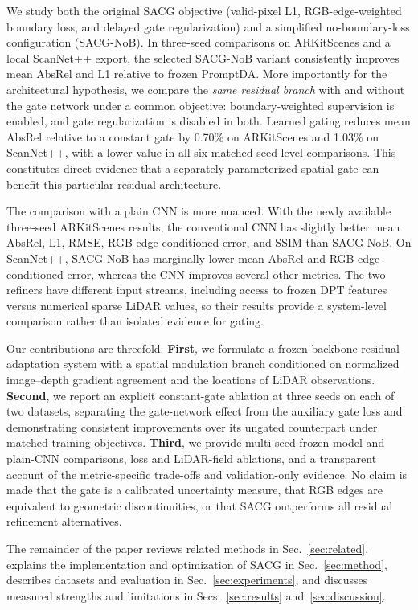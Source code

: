 We study both the original SACG objective (valid-pixel L1, RGB-edge-weighted boundary loss, and delayed gate regularization) and a simplified no-boundary-loss configuration (SACG-NoB). In three-seed comparisons on ARKitScenes and a local ScanNet++ export, the selected SACG-NoB variant consistently improves mean AbsRel and L1 relative to frozen PromptDA. More importantly for the architectural hypothesis, we compare the \emph{same residual branch} with and without the gate network under a common objective: boundary-weighted supervision is enabled, and gate regularization is disabled in both. Learned gating reduces mean AbsRel relative to a constant gate by 0.70\% on ARKitScenes and 1.03\% on ScanNet++, with a lower value in all six matched seed-level comparisons. This constitutes direct evidence that a separately parameterized spatial gate can benefit this particular residual architecture.

The comparison with a plain CNN is more nuanced. With the newly available three-seed ARKitScenes results, the conventional CNN has slightly better mean AbsRel, L1, RMSE, RGB-edge-conditioned error, and SSIM than SACG-NoB. On ScanNet++, SACG-NoB has marginally lower mean AbsRel and RGB-edge-conditioned error, whereas the CNN improves several other metrics. The two refiners have different input streams, including access to frozen DPT features versus numerical sparse LiDAR values, so their results provide a system-level comparison rather than isolated evidence for gating.

Our contributions are threefold. \textbf{First}, we formulate a frozen-backbone residual adaptation system with a spatial modulation branch conditioned on normalized image--depth gradient agreement and the locations of LiDAR observations. \textbf{Second}, we report an explicit constant-gate ablation at three seeds on each of two datasets, separating the gate-network effect from the auxiliary gate loss and demonstrating consistent improvements over its ungated counterpart under matched training objectives. \textbf{Third}, we provide multi-seed frozen-model and plain-CNN comparisons, loss and LiDAR-field ablations, and a transparent account of the metric-specific trade-offs and validation-only evidence. No claim is made that the gate is a calibrated uncertainty measure, that RGB edges are equivalent to geometric discontinuities, or that SACG outperforms all residual refinement alternatives.

The remainder of the paper reviews related methods in Sec.~\ref{sec:related}, explains the implementation and optimization of SACG in Sec.~\ref{sec:method}, describes datasets and evaluation in Sec.~\ref{sec:experiments}, and discusses measured strengths and limitations in Secs.~\ref{sec:results} and~\ref{sec:discussion}.
